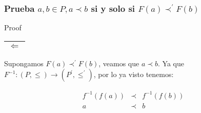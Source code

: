 \begin{frame}
	\frametitle{Prueba $a, b \in P, a \prec b$ si y solo si $F(a) \prec^{\prime} F(b)$}

	\begin{block}{Proof}
		\PN \begin{tabular}{|c|} \hline $\Leftarrow$ \\\hline \end{tabular} Supongamos $F(a) \prec^{\prime} F(b)$, veamos
		que $a \prec b$. Ya que $F^{-1}: (P, \leq) \rightarrow (P^{\prime}, \leq^{\prime})$, por lo ya visto tenemos:

		\begin{eqnarray*}
			f^{-1}(f(a)) &\prec& f^{-1}(f(b)) \\
			a &\prec& b
		\end{eqnarray*}
	\end{block}
\end{frame}
